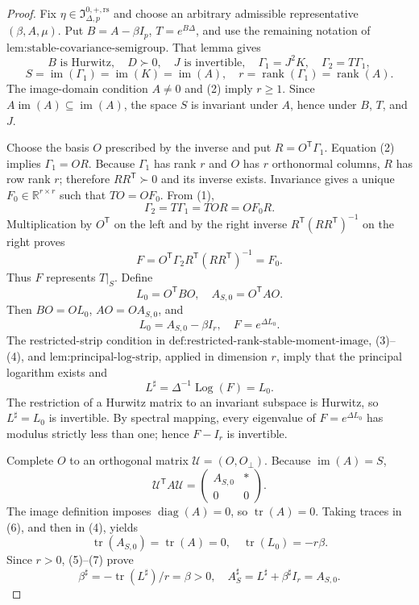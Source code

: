\documentclass{article}
\begin{document}
\begin{proof}
Fix \(\eta\in\mathfrak I_{\Delta,p}^{0,+,\mathrm{rs}}\) and choose an arbitrary admissible representative \((\beta,A,\mu)\).  Put \(B=A-\beta I_p\), \(T=e^{B\Delta}\), and use the remaining notation of \(\text{lem:stable-covariance-semigroup}\).  That lemma gives
\[
 B\text{ is Hurwitz},\quad D\succ0,\quad J\text{ is invertible},
 \quad \Gamma_1=J^2K,\quad \Gamma_2=T\Gamma_1,
\tag{1}
\]
\[
 S=\operatorname{im}(\Gamma_1)=\operatorname{im}(K)=\operatorname{im}(A),
 \quad r=\operatorname{rank}(\Gamma_1)=\operatorname{rank}(A).
\tag{2}
\]
The image-domain condition \(A\neq0\) and (2) imply \(r\geq1\).  Since \(A\operatorname{im}(A)\subseteq\operatorname{im}(A)\), the space \(S\) is invariant under \(A\), hence under \(B\), \(T\), and \(J\).

Choose the basis \(O\) prescribed by the inverse and put \(R=O^{\mathsf T}\Gamma_1\).  Equation (2) implies \(\Gamma_1=OR\).  Because \(\Gamma_1\) has rank \(r\) and \(O\) has \(r\) orthonormal columns, \(R\) has row rank \(r\); therefore \(RR^{\mathsf T}\succ0\) and its inverse exists.  Invariance gives a unique \(F_0\in\mathbb R^{r\times r}\) such that \(TO=OF_0\).  From (1),
\[
 \Gamma_2=T\Gamma_1=TO R=OF_0R.
\]
Multiplication by \(O^{\mathsf T}\) on the left and by the right inverse \(R^{\mathsf T}(RR^{\mathsf T})^{-1}\) on the right proves
\[
 F=O^{\mathsf T}\Gamma_2R^{\mathsf T}(RR^{\mathsf T})^{-1}=F_0.
\tag{3}
\]
Thus \(F\) represents \(T|_S\).  Define
\[
 L_0=O^{\mathsf T}BO,\quad A_{S,0}=O^{\mathsf T}AO.
\]
Then \(BO=OL_0\), \(AO=OA_{S,0}\), and
\[
 L_0=A_{S,0}-\beta I_r,\quad F=e^{\Delta L_0}.
\tag{4}
\]
The restricted-strip condition in \(\text{def:restricted-rank-stable-moment-image}\), (3)--(4), and \(\text{lem:principal-log-strip}\), applied in dimension \(r\), imply that the principal logarithm exists and
\[
 L^\sharp=\Delta^{-1}\operatorname{Log}(F)=L_0.
\tag{5}
\]
The restriction of a Hurwitz matrix to an invariant subspace is Hurwitz, so \(L^\sharp=L_0\) is invertible.  By spectral mapping, every eigenvalue of \(F=e^{\Delta L_0}\) has modulus strictly less than one; hence \(F-I_r\) is invertible.

Complete \(O\) to an orthogonal matrix \(\mathcal U=(O,O_\perp)\).  Because \(\operatorname{im}(A)=S\),
\[
 \mathcal U^{\mathsf T}A\mathcal U
 =\begin{pmatrix}A_{S,0}&*\\0&0\end{pmatrix}.
\tag{6}
\]
The image definition imposes \(\operatorname{diag}(A)=0\), so \(\operatorname{tr}(A)=0\).  Taking traces in (6), and then in (4), yields
\[
 \operatorname{tr}(A_{S,0})=\operatorname{tr}(A)=0,
 \quad \operatorname{tr}(L_0)=-r\beta.
\tag{7}
\]
Since \(r>0\), (5)--(7) prove
\[
 \beta^\sharp=-\operatorname{tr}(L^\sharp)/r=\beta>0,
 \quad A_S^\sharp=L^\sharp+\beta^\sharp I_r=A_{S,0}.
\tag{8}
\]


\end{proof}
\end{document}

